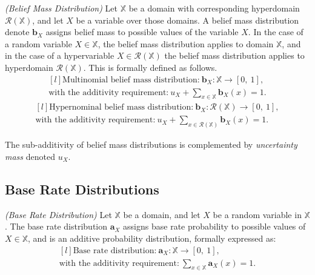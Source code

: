 \begin{definition}
	\emph{(Belief Mass Distribution)} Let $\mathbb{X}$ be a domain with corresponding hyperdomain $\mathcal{R}(\mathbb{X})$, and let $X$ be a variable over those domains. A belief mass distribution denote $\mathbf{b}_X$ assigns belief mass to possible values of the variable $X$. In the case of a random variable $X \in \mathbb{X}$, the belief mass distribution applies to domain $\mathbb{X}$, and in the case of a hypervariable $X \in \mathcal{R}(\mathbb{X})$ the belief mass distribution applies to hyperdomain $\mathcal{R}(\mathbb{X})$. This is formally defined as follows.
	\begin{equation}\label{eq:multinomial-belief-mass-dristribution}
		\begin{matrix*}[l]
			\text{Multinomial belief mass distribution:}\ \mathbf{b}_X : \mathbb{X} \rightarrow [0,\ 1], \\
			\text{with the additivity requirement:}\ u_X + \sum_{x \in \mathbb{X}} \mathbf{b}_X(x) = 1\text{.}
		\end{matrix*}
	\end{equation}
	\begin{equation}\label{eq:hypernomal_belief_mass_distribution}
		\begin{matrix*}[l]
			\text{Hypernominal belief mass distribution:}\ \mathbf{b}_X : \mathcal{R}(\mathbb{X}) \rightarrow [0,\ 1], \\
			\text{with the additivity requirement:}\ u_X + \sum_{x \in \mathcal{R}(\mathbb{X})} \mathbf{b}_X(x) = 1\text{.}
		\end{matrix*}
	\end{equation}
\end{definition}

The sub-additivity of belief mass distributions is complemented by \emph{uncertainty mass} denoted $u_X$.

\subsection{Base Rate Distributions}

\begin{definition}\label{def:base_rate_distribution}
	\emph{(Base Rate Distribution)} Let $\mathbb{X}$ be a domain, and let $X$ be a random variable in $\mathbb{X}$. The base rate distribution $\mathbf{a}_X$ assigns base rate probability to possible values of $X \in \mathbb{X}$, and is an additive probability distribution, formally expressed as:
	\begin{equation}\label{eq:base_rate_distribution}
		\begin{matrix*}[l]
			\text{Base rate distribution:}\ \mathbf{a}_X : \mathbb{X} \rightarrow [0,\ 1], \\
			\text{with the additivity requirement:}\ \sum_{x \in \mathbb{X}} \mathbf{a}_X(x) = 1\text{.}
		\end{matrix*}
	\end{equation}
\end{definition}

